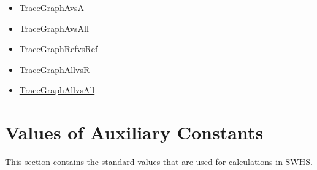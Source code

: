 \documentclass[12pt]{article}
\begin{document}
\begin{itemize}
\item{\hyperref{../../TraceyGraph/avsa.svg}{}{}{TraceGraphAvsA}}
\item{\hyperref{../../TraceyGraph/avsall.svg}{}{}{TraceGraphAvsAll}}
\item{\hyperref{../../TraceyGraph/refvsref.svg}{}{}{TraceGraphRefvsRef}}
\item{\hyperref{../../TraceyGraph/allvsr.svg}{}{}{TraceGraphAllvsR}}
\item{\hyperref{../../TraceyGraph/allvsall.svg}{}{}{TraceGraphAllvsAll}}
\end{itemize}
\section{Values of Auxiliary Constants}
\label{Sec:AuxConstants}
This section contains the standard values that are used for calculations in SWHS.
\end{document}
